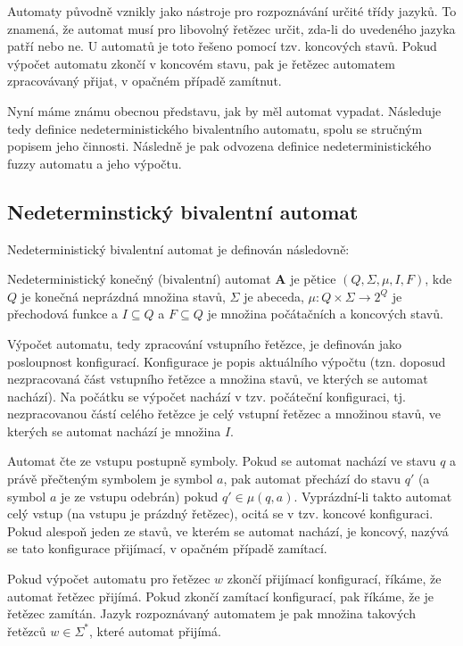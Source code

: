 Automaty původně vznikly jako nástroje pro rozpoznávání určité třídy jazyků. To znamená, že automat musí pro libovolný řetězec určit, zda-li do uvedeného jazyka patří nebo ne. U automatů je toto řešeno pomocí tzv. koncových stavů. Pokud výpočet automatu zkončí v koncovém stavu, pak je řetězec automatem zpracovávaný přijat, v opačném případě zamítnut.

Nyní máme známu obecnou představu, jak by měl automat vypadat. Následuje tedy definice nedeterministického bivalentního automatu, spolu se stručným popisem jeho činnosti. Následně je pak odvozena definice nedeterministického fuzzy automatu a jeho výpočtu.

\subsection{Nedeterminstický bivalentní automat}
Nedeterministický bivalentní automat je definován následovně:

\begin{definition}\label{def-NedBivAut}
 Nedeterministický konečný (bivalentní) automat $\mathbf{A}$ je pětice $(Q, \Sigma, \mu, I, F)$, kde $Q$ je konečná neprázdná množina stavů, $\Sigma$ je abeceda, $\mu: Q \times \Sigma \rightarrow 2^Q$ je přechodová funkce a $I \subseteq Q$ a $F \subseteq Q$ je množina počátačních a koncových stavů.
\end{definition}

Výpočet automatu, tedy zpracování vstupního řetězce, je definován jako posloupnost konfigurací. Konfigurace je popis aktuálního  výpočtu (tzn. doposud nezpracovaná část vstupního řetězce a množina stavů, ve kterých se automat nachází). Na počátku se výpočet nachází v tzv. počáteční konfiguraci, tj. nezpracovanou částí celého řetězce je celý vstupní řetězec a množinou stavů, ve kterých se automat nachází je množina $I$.

Automat čte ze vstupu postupně symboly. Pokud se automat nachází ve stavu $q$ a právě přečteným symbolem je symbol $a$, pak automat přechází do stavu $q'$ (a symbol $a$ je ze vstupu odebrán) pokud $q' \in \mu(q, a)$. Vyprázdní-li takto automat celý vstup (na vstupu je prázdný řetězec), ocitá se v tzv. koncové konfiguraci. Pokud alespoň jeden ze stavů, ve kterém se automat nachází, je koncový, nazývá se tato konfigurace přijímací, v opačném případě zamítací.

Pokud výpočet automatu pro řetězec $w$ zkončí přijímací konfigurací, říkáme, že automat řetězec přijímá. Pokud zkončí zamítací konfigurací, pak říkáme, že je řetězec zamítán. Jazyk rozpoznávaný automatem je pak množina takových řetězců $w \in \Sigma^*$, které automat přijímá.

